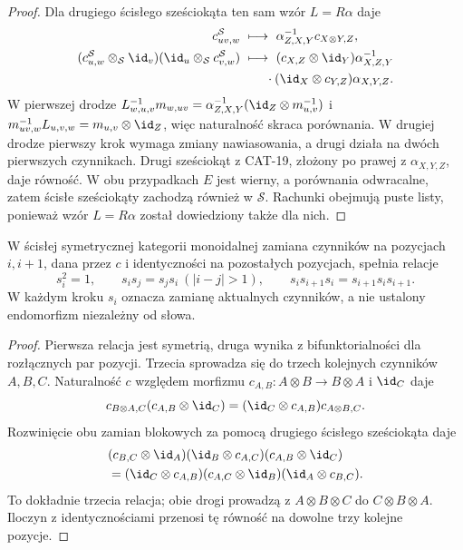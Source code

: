 \begin{proof}
Dla drugiego ścisłego sześciokąta ten sam wzór $L=R\alpha$ daje
\[
\begin{aligned}
c^{\mathcal S}_{uv,w}&\ \longmapsto\
 \alpha_{Z,X,Y}^{-1}c_{X\otimes Y,Z},\\
(c^{\mathcal S}_{u,w}\otimes_{\mathcal S}\id_v)
(\id_u\otimes_{\mathcal S} c^{\mathcal S}_{v,w})
&\ \longmapsto\
(c_{X,Z}\otimes\id_Y)\alpha_{X,Z,Y}^{-1}\\
&\qquad{}\cdot(\id_X\otimes c_{Y,Z})\alpha_{X,Y,Z}.
\end{aligned}
\]
W pierwszej drodze $L_{w,u,v}^{-1}m_{w,uv}=\alpha_{Z,X,Y}^{-1}(\id_Z\otimes m_{u,v}^{-1})$ i $m_{uv,w}^{-1}L_{u,v,w}=m_{u,v}\otimes\id_Z$, więc naturalność skraca porównania. W drugiej drodze pierwszy krok wymaga zmiany nawiasowania, a drugi działa na dwóch pierwszych czynnikach. Drugi sześciokąt z CAT-19, złożony po prawej z $\alpha_{X,Y,Z}$, daje równość. W obu przypadkach $E$ jest wierny, a porównania odwracalne, zatem ścisłe sześciokąty zachodzą również w $\mathcal S$. Rachunki obejmują puste listy, ponieważ wzór $L=R\alpha$ został dowiedziony także dla nich.
\end{proof}

\begin{lemat}\label{cat:lem:coxeter-swaps}
W ścisłej symetrycznej kategorii monoidalnej zamiana czynników na pozycjach $i,i+1$, dana przez $c$ i identyczności na pozostałych pozycjach, spełnia relacje
\[
s_i^2=1,\qquad s_i s_j=s_j s_i\ (|i-j|>1),\qquad
s_i s_{i+1}s_i=s_{i+1}s_i s_{i+1}.
\]
W każdym kroku $s_i$ oznacza zamianę aktualnych czynników, a nie ustalony endomorfizm niezależny od słowa.
\end{lemat}
\begin{proof}
Pierwsza relacja jest symetrią, druga wynika z bifunktorialności dla rozłącznych par pozycji. Trzecia sprowadza się do trzech kolejnych czynników $A,B,C$. Naturalność $c$ względem morfizmu $c_{A,B}:A\otimes B\to B\otimes A$ i $\id_C$ daje
\[
c_{B\otimes A,C}(c_{A,B}\otimes\id_C)
=(\id_C\otimes c_{A,B})c_{A\otimes B,C}.
\]
Rozwinięcie obu zamian blokowych za pomocą drugiego ścisłego sześciokąta daje
\[
\begin{aligned}
&(c_{B,C}\otimes\id_A)(\id_B\otimes c_{A,C})(c_{A,B}\otimes\id_C)\\
&=(\id_C\otimes c_{A,B})(c_{A,C}\otimes\id_B)(\id_A\otimes c_{B,C}).
\end{aligned}
\]
To dokładnie trzecia relacja; obie drogi prowadzą z $A\otimes B\otimes C$ do $C\otimes B\otimes A$. Iloczyn z identycznościami przenosi tę równość na dowolne trzy kolejne pozycje.
\end{proof}

